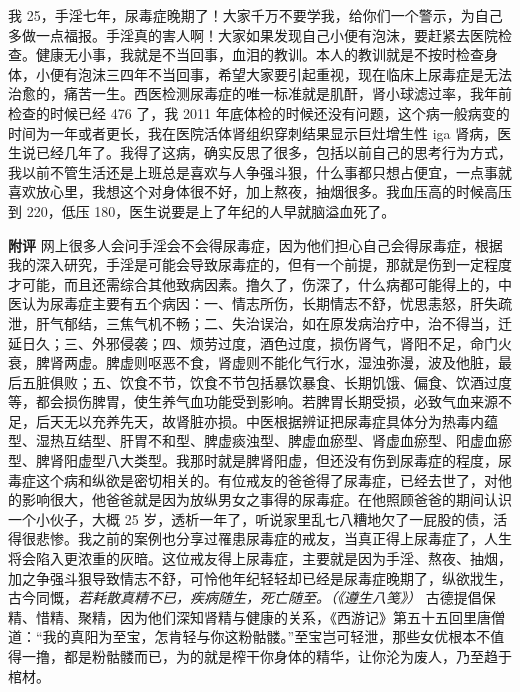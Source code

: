 \begin{case}
    我 25，手淫七年，尿毒症晚期了！大家千万不要学我，给你们一个警示，为自己多做一点福报。手淫真的害人啊！大家如果发现自己小便有泡沫，要赶紧去医院检查。健康无小事，我就是不当回事，血泪的教训。本人的教训就是不按时检查身体，小便有泡沫三四年不当回事，希望大家要引起重视，现在临床上尿毒症是无法治愈的，痛苦一生。西医检测尿毒症的唯一标准就是肌酐，肾小球滤过率，我年前检查的时候已经 476 了，我 2011 年底体检的时候还没有问题，这个病一般病变的时间为一年或者更长，我在医院活体肾组织穿刺结果显示巨灶增生性 iga 肾病，医生说已经几年了。我得了这病，确实反思了很多，包括以前自己的思考行为方式，我以前不管生活还是上班总是喜欢与人争强斗狠，什么事都只想占便宜，一点事就喜欢放心里，我想这个对身体很不好，加上熬夜，抽烟很多。我血压高的时候高压到 220，低压 180，医生说要是上了年纪的人早就脑溢血死了。

    \textbf{附评} 网上很多人会问手淫会不会得尿毒症，因为他们担心自己会得尿毒症，根据我的深入研究，手淫是可能会导致尿毒症的，但有一个前提，那就是伤到一定程度才可能，而且还需综合其他致病因素。撸久了，伤深了，什么病都可能得上的，中医认为尿毒症主要有五个病因：一、情志所伤，长期情志不舒，忧思恚怒，肝失疏泄，肝气郁结，三焦气机不畅；二、失治误治，如在原发病治疗中，治不得当，迁延日久；三、外邪侵袭；四、烦劳过度，酒色过度，损伤肾气，肾阳不足，命门火衰，脾肾两虚。脾虚则呕恶不食，肾虚则不能化气行水，湿浊弥漫，波及他脏，最后五脏俱败；五、饮食不节，饮食不节包括暴饮暴食、长期饥饿、偏食、饮酒过度等，都会损伤脾胃，使生养气血功能受到影响。若脾胃长期受损，必致气血来源不足，后天无以充养先天，故肾脏亦损。中医根据辨证把尿毒症具体分为热毒内蕴型、湿热互结型、肝胃不和型、脾虚痰浊型、脾虚血瘀型、肾虚血瘀型、阳虚血瘀型、脾肾阳虚型八大类型。我那时就是脾肾阳虚，但还没有伤到尿毒症的程度，尿毒症这个病和纵欲是密切相关的。有位戒友的爸爸得了尿毒症，已经去世了，对他的影响很大，他爸爸就是因为放纵男女之事得的尿毒症。在他照顾爸爸的期间认识一个小伙子，大概 25 岁，透析一年了，听说家里乱七八糟地欠了一屁股的债，活得很悲惨。我之前的案例也分享过罹患尿毒症的戒友，当真正得上尿毒症了，人生将会陷入更浓重的灰暗。这位戒友得上尿毒症，主要就是因为手淫、熬夜、抽烟，加之争强斗狠导致情志不舒，可怜他年纪轻轻却已经是尿毒症晚期了，纵欲戕生，古今同慨，\textit{若耗散真精不已，疾病随生，死亡随至。（《遵生八笺》）} 古德提倡保精、惜精、聚精，因为他们深知肾精与健康的关系，《西游记》第五十五回里唐僧道：“我的真阳为至宝，怎肯轻与你这粉骷髅。”至宝岂可轻泄，那些女优根本不值得一撸，都是粉骷髅而已，为的就是榨干你身体的精华，让你沦为废人，乃至趋于棺材。
\end{case}

